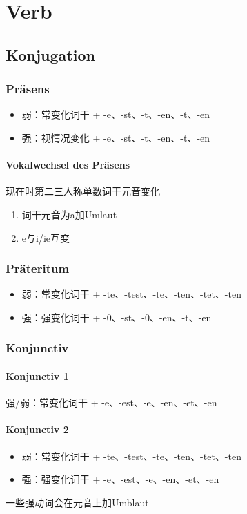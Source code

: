 \documentclass[UTF8]{report}
\begin{document}
\chapter{Verb}
\section{Konjugation}


\subsection{Präsens}
\begin{itemize}
    \item 弱：常变化词干 + -e、-st、-t、-en、-t、-en
    \item 强：视情况变化 + -e、-st、-t、-en、-t、-en
\end{itemize}


\subsubsection{Vokalwechsel des Präsens}
现在时第二三人称单数词干元音变化
\begin{enumerate}
    \item 词干元音为a加Umlaut
    \item e与i/ie互变
\end{enumerate}


\subsection{Präteritum}
\begin{itemize}
    \item 弱：常变化词干 + -te、-test、-te、-ten、-tet、-ten
    \item 强：强变化词干 + -0、-st、-0、-en、-t、-en
\end{itemize}



\subsection{Konjunctiv}
\subsubsection{Konjunctiv 1}
强/弱：常变化词干 + -e、-est、-e、-en、-et、-en
\subsubsection{Konjunctiv 2}
\begin{itemize}
    \item 弱：常变化词干 + -te、-test、-te、-ten、-tet、-ten
    \item 强：强变化词干 + -e、-est、-e、-en、-et、-en
\end{itemize}
一些强动词会在元音上加Umblaut
\end{document}

